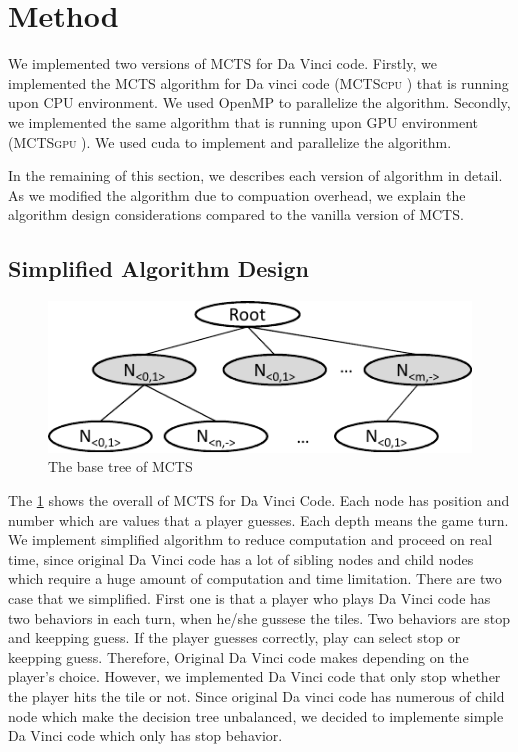 \documentclass[conference]{IEEEtran}
\newcommand{\cpu} {\textsc{MCTScpu} }
\newcommand{\gpu} {\textsc{MCTSgpu} }
\begin{document}
\section{Method}
We implemented two versions of MCTS for Da Vinci code. 
Firstly, we implemented the MCTS algorithm for Da vinci code (\cpu) that is running upon CPU environment.
We used OpenMP to parallelize the algorithm.
Secondly, we implemented the same algorithm that is running upon GPU environment (\gpu).
We used cuda to implement and parallelize the algorithm.

In the remaining of this section, we describes each version of algorithm in detail. 
As we modified the algorithm due to compuation overhead, we explain the algorithm design considerations compared to the vanilla version of MCTS.

\subsection{Simplified Algorithm Design}

\begin{figure}
\includegraphics[width=0.95\columnwidth]{figures/base_tree.pdf}
\caption{The base tree of MCTS}
\label{fig:base_tree}
\end{figure}

The \cref{fig:base_tree} shows the overall of MCTS for Da Vinci Code. 
Each node has position and number which are values that a player guesses. Each depth means the game turn. 
We implement simplified algorithm to reduce computation and proceed on real time, since original Da Vinci code has a lot of sibling nodes and child nodes which require a huge amount of computation and time limitation. 
There are two case that we simplified. 
First one is that a player who plays Da Vinci code has two behaviors in each turn, when he/she gussese the tiles. 
Two behaviors are stop and keepping guess. 
If the player guesses correctly, play can select stop or keepping guess. 
Therefore, Original Da Vinci code makes depending on the player's choice. 
However, we implemented Da Vinci code that only stop whether the player hits the tile or not. 
Since original Da vinci code has numerous of child node which make the decision tree unbalanced, we decided to implemente simple Da Vinci code which only has stop behavior.
 
\end{document}
